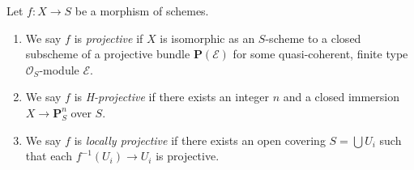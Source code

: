 \begin{definition}
\label{definition-projective}
Let $f : X \to S$ be a morphism of schemes.
\begin{enumerate}
\item We say $f$ is {\it projective} if $X$ is isomorphic as
an $S$-scheme to a closed subscheme of a projective
bundle $\mathbf{P}(\mathcal{E})$
for some quasi-coherent, finite type $\mathcal{O}_S$-module $\mathcal{E}$.
\item We say $f$ is {\it H-projective} if there exists an integer $n$ and
a closed immersion $X \to \mathbf{P}^n_S$ over $S$.
\item We say $f$ is {\it locally projective} if there exists an open
covering $S = \bigcup U_i$ such that each $f^{-1}(U_i) \to U_i$ is
projective.
\end{enumerate}
\end{definition}